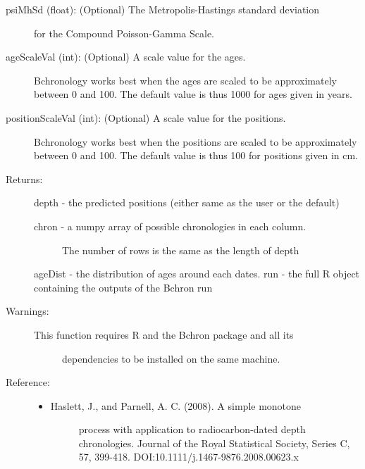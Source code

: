 \documentclass[letterpaper,10pt,english]{sphinxmanual}
\begin{document}
\begin{fulllineitems}
\begin{description}
\begin{description}
\item[{psiMhSd (float): (Optional) The Metropolis-Hastings standard deviation }] \leavevmode
for the Compound Poisson-Gamma Scale.

\item[{ageScaleVal (int): (Optional) A scale value for the ages. }] \leavevmode
Bchronology works best when the ages are scaled to be 
approximately between 0 and 100.
The default value is thus 1000 for ages given in years.

\item[{positionScaleVal (int):  (Optional) A scale value for the positions. }] \leavevmode
Bchronology works best when the positions are scaled to be 
approximately between 0 and 100. The default value is thus
100 for positions given in cm.

\item[{Returns:}] \leavevmode
depth - the predicted positions (either same as the user or the default)
\begin{description}
\item[{chron -  a numpy array of possible chronologies in each column.}] \leavevmode
The number of rows is the same as the length of depth

\end{description}

ageDist - the distribution of ages around each dates.
run - the full R object containing the outputs of the Bchron run

\item[{Warnings:}] \leavevmode\begin{description}
\item[{This function requires R and the Bchron package and all its}] \leavevmode
dependencies to be installed on the same machine.

\end{description}

\item[{Reference:}] \leavevmode\begin{itemize}
\item {} \begin{description}
\item[{Haslett, J., and Parnell, A. C. (2008). A simple monotone }] \leavevmode
process with application to radiocarbon-dated depth 
chronologies. Journal of the Royal Statistical Society, 
Series C, 57, 399-418. DOI:10.1111/j.1467-9876.2008.00623.x

\end{description}


\end{itemize}
\end{description}
\end{description}
\end{fulllineitems}
\end{document}
